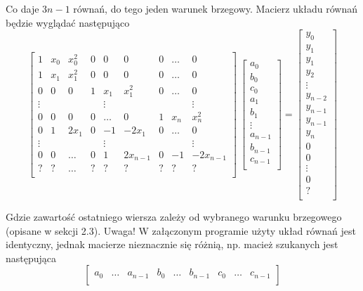 \documentclass{article}
\begin{document}
Co daje $3n-1$ równań, do tego jeden warunek brzegowy. Macierz układu równań będzie wyglądać
następująco
\[
\begin{bmatrix}
1 & x_0 & x_0^2 & 0 & 0 & 0 & 0 & \hdots & 0 \\
1 & x_1 & x_1^2 & 0 & 0 & 0 & 0 & \hdots & 0 \\
0 & 0 & 0 & 1 & x_1 & x_1^2 & 0 & \hdots & 0 \\
\vdots &&&& \vdots &&&& \vdots \\
0 & 0 & 0 & 0 & \hdots & 0 & 1 & x_n & x_n^2 \\
0 & 1 & 2x_1 & 0 & -1 & -2x_1 & 0 & \hdots & 0 \\
\vdots &&&& \vdots &&&& \vdots \\
0 & 0 & \hdots & 0 & 1 & 2x_{n-1} & 0 & -1 & -2x_{n-1} \\
? & ? & \hdots & ? & ? & ? & ? & ? & ?\\ 
\end{bmatrix}
\:
\begin{bmatrix}
a_0 \\
b_0 \\
c_0 \\
a_1 \\
b_1 \\
\vdots \\
a_{n-1} \\
b_{n-1} \\
c_{n-1} \\
\end{bmatrix}
=
\begin{bmatrix}
y_0 \\
y_1 \\
y_1 \\
y_2 \\
\vdots \\
y_{n-2} \\
y_{n-1} \\
y_{n-1} \\
y_n \\
0 \\
0 \\
\vdots \\
0 \\
? \\
\end{bmatrix}
\]

Gdzie zawartość ostatniego wiersza zależy od wybranego warunku brzegowego (opisane w sekcji 2.3).
Uwaga! W załączonym programie użyty układ równań jest identyczny, jednak macierze nieznacznie się różnią, 
np. macież szukanych jest następująca
\[
\begin{bmatrix}
a_0 & \hdots & a_{n-1} & b_0 & \hdots & b_{n-1} & c_0 & \hdots & c_{n-1} \\
\end{bmatrix}
\]
\end{document}
